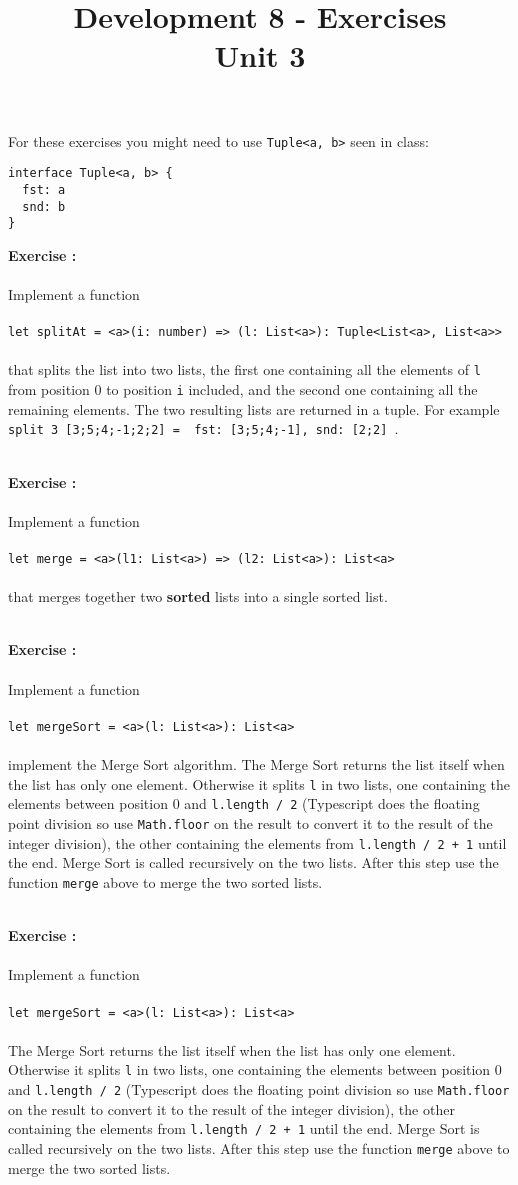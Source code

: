 \documentclass[]{article}
\title{Development 8 - Exercises\\Unit 3}
\author{}
\date{}
\newcounter{ExerciseCount}
\newcommand{\functionEx}[3]{
  Implement a function\\\\
   \texttt{let #1 = #2}\\\\ #3
}
\newcommand{\exercise}[1]{\noindent \textbf{Exercise \theExerciseCount:}\\\\ #1 \addtocounter{ExerciseCount}{1}
}
\begin{document}
\maketitle

\noindent
For these exercises you might need to use \texttt{Tuple<a, b>} seen in class:

\begin{lstlisting}
interface Tuple<a, b> {
  fst: a
  snd: b
}
\end{lstlisting}

\exercise{
  \functionEx{splitAt}{<a>(i: number) => (l: List<a>): Tuple<List<a>, List<a>>}{
    that splits the list into two lists, the first one containing all the elements of \texttt{l} from position 0 to position \texttt{i} included, and the second one containing all the remaining elements. The two resulting lists are returned in a tuple. For example \texttt{split 3 [3;5;4;-1;2;2] = { fst: [3;5;4;-1], snd: [2;2] }}.
}}\\

\exercise{
  \functionEx{merge}{<a>(l1: List<a>) => (l2: List<a>): List<a>}{
   that merges together two \textbf{sorted} lists into a single sorted list.
}}\\

\exercise{
  \functionEx{mergeSort}{<a>(l: List<a>): List<a>}{
  implement the Merge Sort algorithm. The Merge Sort returns the list itself when the list has only one element. Otherwise it splits \texttt{l} in two lists, one containing the elements between position 0 and \texttt{l.length / 2} (Typescript does the floating point division so use \texttt{Math.floor} on the result to convert it to the result of the integer division), the other containing the elements from \texttt{l.length / 2 + 1} until the end. Merge Sort is called recursively on the two lists. After this step use the function \texttt{merge} above to merge the two sorted lists.
}}\\

\exercise{
  \functionEx{mergeSort}{<a>(l: List<a>): List<a>}{
  The Merge Sort returns the list itself when the list has only one element. Otherwise it splits \texttt{l} in two lists, one containing the elements between position 0 and \texttt{l.length / 2} (Typescript does the floating point division so use \texttt{Math.floor} on the result to convert it to the result of the integer division), the other containing the elements from \texttt{l.length / 2 + 1} until the end. Merge Sort is called recursively on the two lists. After this step use the function \texttt{merge} above to merge the two sorted lists.
}}\\
\end{document}

